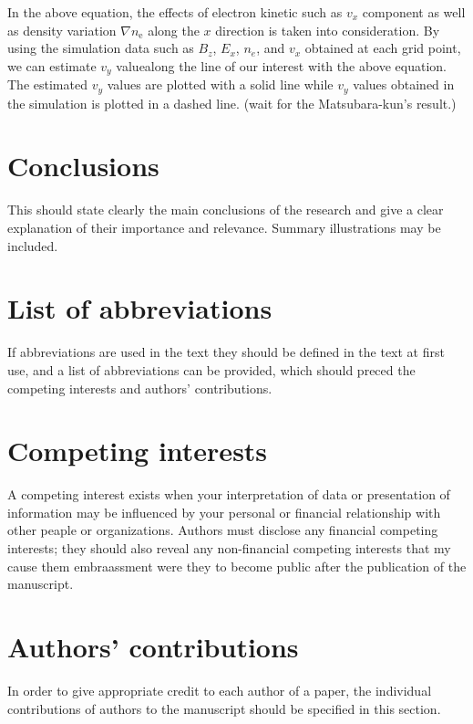 \documentclass{EPS}
\begin{document}
In the above equation, 
the effects of electron kinetic such as $v_x$ component as well as 
density variation $\nabla n_\mathrm{e}$ along the $x$ direction is taken into consideration. 
By using the simulation data such as $B_z$, $E_x$, $n_e$, and $v_x$ obtained at each grid point, 
we can estimate $v_y$ valuealong the line of our interest with the above equation. 
The estimated $v_y$ values are plotted with a solid line while $v_y$ values obtained in the simulation is plotted in a dashed line.  (wait for the Matsubara-kun's result.)






\section{Conclusions}

This should state clearly the main conclusions of the research
and give a clear explanation of their importance and relevance.
Summary illustrations may be included.

\section{List of abbreviations}

If abbreviations are used in the text
they should be defined in the text at first use,
and a list of abbreviations can be provided,
which should preced the competing interests and authors' contributions.

\section{Competing interests}

A competing interest exists when your interpretation of data or
presentation of information may be influenced by your personal or
financial relationship with other peaple or organizations.
Authors must disclose any financial competing interests;
they should also reveal any non-financial competing interests
that my cause them embraassment were they to become public
after the publication of the manuscript.

\section{Authors' contributions}

In order to give appropriate credit to each author of a paper,
the individual contributions of authors to the manuscript
should be specified in this section.
\end{document}
